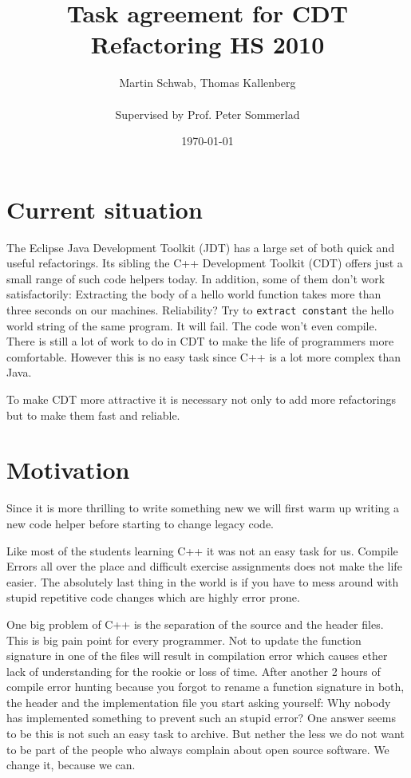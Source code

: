 \documentclass[a4paper,10pt]{scrreprt}
\title{Task agreement for CDT Refactoring HS 2010}
\author{Martin Schwab, Thomas Kallenberg\\ \\Supervised by Prof. Peter Sommerlad}
\date{\today}
\begin{document}
\maketitle

\section{Current situation}

The Eclipse Java Development Toolkit (JDT) has a large set of both quick and useful refactorings. Its sibling the C++ Development Toolkit (CDT) offers just a small range of such code helpers today. In addition, some of them don't work satisfactorily: Extracting the body of a hello world function takes more than three seconds on our machines. Reliability? Try to \texttt{extract constant} the hello world string of the same program. It will fail. The code won't even compile. There is still a lot of work to do in CDT to make the life of programmers more comfortable. However this is no easy task since C++ is a lot more complex than Java.

To make CDT more attractive it is necessary not only to add more refactorings but to make them fast and reliable.

\section{Motivation}
Since it is more thrilling to write something new we will first warm up writing a new code helper before starting to change legacy code.

Like most of the students learning C++ it was not an easy task for us. Compile Errors all over the place and difficult exercise assignments does not make the life easier. The absolutely last thing in the world is if you have to mess around with stupid repetitive code changes which are highly error prone.

One big problem of C++ is the separation of the source and the header files. This is big pain point for every programmer. Not to update the function signature in one of the files will result in compilation error which causes ether lack of understanding for the rookie or loss of time.\newline
After another 2 hours of compile error hunting because you forgot to rename a function signature in both, the header and the implementation file you start asking yourself: Why nobody has implemented something to prevent such an stupid error?\newline
One answer seems to be this is not such an easy task to archive. But nether the less we do not want to be part of the people who always complain about open source software. We change it, because we can.
\end{document}
